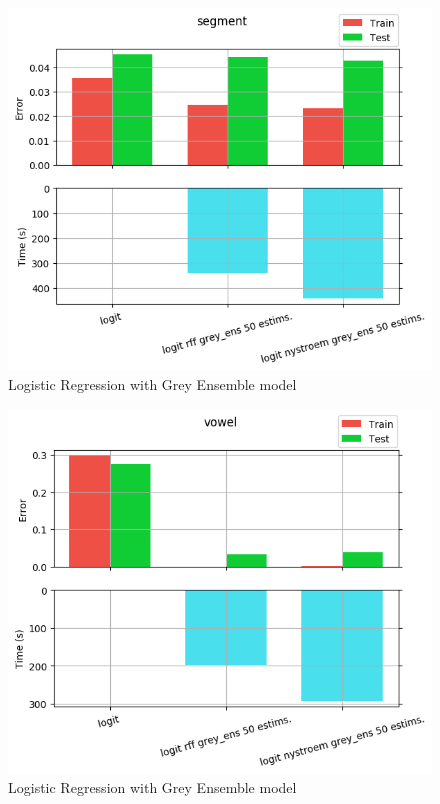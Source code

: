 \begin{figure}[th]
\centering
\includegraphics[scale=\imgscale]{Figures/2_4/segment}
\decoRule
\caption[2.4 segment]{Logistic Regression with Grey Ensemble model}
\label{fig:2_4_segment}
\end{figure}

\begin{figure}[th]
\centering
\includegraphics[scale=\imgscale]{Figures/2_4/vowel}
\decoRule
\caption[2.4 vowel]{Logistic Regression with Grey Ensemble model}
\label{fig:vowel}
\end{figure}
